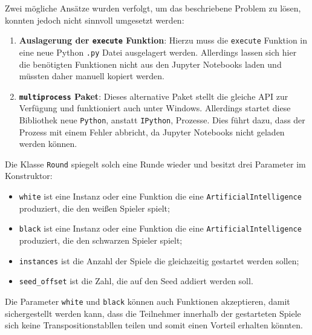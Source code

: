 \documentclass[11pt]{article}
\providecommand{\tightlist}{%
      \setlength{\itemsep}{0pt}\setlength{\parskip}{0pt}}
\begin{document}
Zwei mögliche Ansätze wurden verfolgt, um das beschriebene Problem zu
lösen, konnten jedoch nicht sinnvoll umgesetzt werden:

\begin{enumerate}
\def\labelenumi{\arabic{enumi}.}
\tightlist
\item
  \textbf{Auslagerung der \texttt{execute} Funktion}: Hierzu muss die
  \texttt{execute} Funktion in eine neue Python \texttt{.py} Datei
  ausgelagert werden. Allerdings lassen sich hier die benötigten
  Funktionen nicht aus den Jupyter Notebooks laden und müssten daher
  manuell kopiert werden.
\item
  \textbf{\texttt{multiprocess} Paket}: Dieses alternative Paket stellt
  die gleiche API zur Verfügung und funktioniert auch unter Windows.
  Allerdings startet diese Bibliothek neue \texttt{Python}, anstatt
  \texttt{IPython}, Prozesse. Dies führt dazu, dass der Prozess mit
  einem Fehler abbricht, da Jupyter Notebooks nicht geladen werden
  können.
\end{enumerate}

    Die Klasse \texttt{Round} spiegelt solch eine Runde wieder und besitzt
drei Parameter im Konstruktor:

\begin{itemize}
\tightlist
\item
  \texttt{white} ist eine Instanz oder eine Funktion die eine
  \texttt{ArtificialIntelligence} produziert, die den weißen Spieler
  spielt;
\item
  \texttt{black} ist eine Instanz oder eine Funktion die eine
  \texttt{ArtificialIntelligence} produziert, die den schwarzen Spieler
  spielt;
\item
  \texttt{instances} ist die Anzahl der Spiele die gleichzeitig
  gestartet werden sollen;
\item
  \texttt{seed\_offset} ist die Zahl, die auf den Seed addiert werden
  soll.
\end{itemize}

Die Parameter \texttt{white} und \texttt{black} können auch Funktionen
akzeptieren, damit sichergestellt werden kann, dass die Teilnehmer
innerhalb der gestarteten Spiele sich keine Transpositionstabllen teilen
und somit einen Vorteil erhalten könnten.
\end{document}
